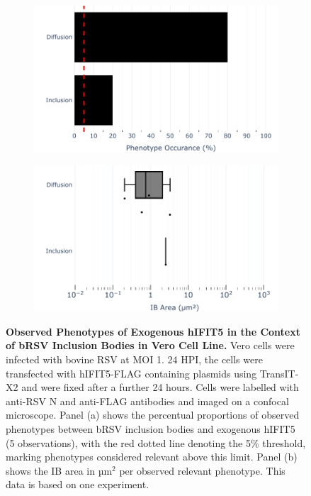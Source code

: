 \begin{figure}
    \begin{subfigure}{0.495\textwidth}
        \caption{}
        \includegraphics[width=1\linewidth]{09. Chapter 4/Figs/02. Overexpression/04. IFIT5/04. bar_i5_brsv.pdf} 
    \end{subfigure}
    \begin{subfigure}{0.495\textwidth}
        \caption{}
        \includegraphics[width=1\linewidth]{09. Chapter 4/Figs/02. Overexpression/04. IFIT5/05. box_i5_brsv.pdf}
    \end{subfigure}
    \caption[Observed Phenotypes of Exogenous hIFIT5 in the Context of bRSV Inclusion Bodies in Vero Cell Line.]{\textbf{Observed Phenotypes of Exogenous hIFIT5 in the Context of bRSV Inclusion Bodies in Vero Cell Line.} Vero cells were infected with bovine RSV at MOI 1. 24 HPI, the cells were transfected with hIFIT5-FLAG containing plasmids using TransIT-X2 and were fixed after a further 24 hours. Cells were labelled with anti-RSV N and anti-FLAG antibodies and imaged on a confocal microscope. Panel (a) shows the percentual proportions of observed phenotypes between bRSV inclusion bodies and exogenous hIFIT5 (5 observations), with the red dotted line denoting the 5\% threshold, marking phenotypes considered relevant above this limit. Panel (b) shows the IB area in \(\mbox{µm}^2\) per observed relevant phenotype. This data is based on one experiment.}
    \label{fig:Observed Phenotypes of Exogenous hIFIT5 in the Context of bRSV Inclusion Bodies in VERO Cell Line}
\end{figure}

